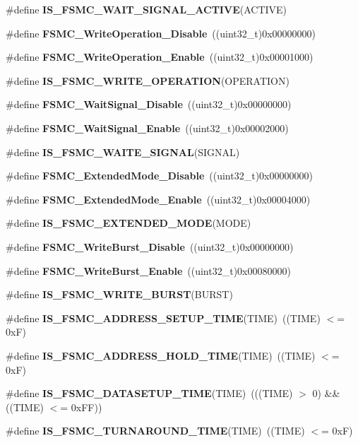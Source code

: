 \begin{DoxyCompactItemize}
\#define \textbf{ I\+S\+\_\+\+F\+S\+M\+C\+\_\+\+W\+A\+I\+T\+\_\+\+S\+I\+G\+N\+A\+L\+\_\+\+A\+C\+T\+I\+VE}(A\+C\+T\+I\+VE)
\item 
\#define \textbf{ F\+S\+M\+C\+\_\+\+Write\+Operation\+\_\+\+Disable}~((uint32\+\_\+t)0x00000000)
\item 
\#define \textbf{ F\+S\+M\+C\+\_\+\+Write\+Operation\+\_\+\+Enable}~((uint32\+\_\+t)0x00001000)
\item 
\#define \textbf{ I\+S\+\_\+\+F\+S\+M\+C\+\_\+\+W\+R\+I\+T\+E\+\_\+\+O\+P\+E\+R\+A\+T\+I\+ON}(O\+P\+E\+R\+A\+T\+I\+ON)
\item 
\#define \textbf{ F\+S\+M\+C\+\_\+\+Wait\+Signal\+\_\+\+Disable}~((uint32\+\_\+t)0x00000000)
\item 
\#define \textbf{ F\+S\+M\+C\+\_\+\+Wait\+Signal\+\_\+\+Enable}~((uint32\+\_\+t)0x00002000)
\item 
\#define \textbf{ I\+S\+\_\+\+F\+S\+M\+C\+\_\+\+W\+A\+I\+T\+E\+\_\+\+S\+I\+G\+N\+AL}(S\+I\+G\+N\+AL)
\item 
\#define \textbf{ F\+S\+M\+C\+\_\+\+Extended\+Mode\+\_\+\+Disable}~((uint32\+\_\+t)0x00000000)
\item 
\#define \textbf{ F\+S\+M\+C\+\_\+\+Extended\+Mode\+\_\+\+Enable}~((uint32\+\_\+t)0x00004000)
\item 
\#define \textbf{ I\+S\+\_\+\+F\+S\+M\+C\+\_\+\+E\+X\+T\+E\+N\+D\+E\+D\+\_\+\+M\+O\+DE}(M\+O\+DE)
\item 
\#define \textbf{ F\+S\+M\+C\+\_\+\+Write\+Burst\+\_\+\+Disable}~((uint32\+\_\+t)0x00000000)
\item 
\#define \textbf{ F\+S\+M\+C\+\_\+\+Write\+Burst\+\_\+\+Enable}~((uint32\+\_\+t)0x00080000)
\item 
\#define \textbf{ I\+S\+\_\+\+F\+S\+M\+C\+\_\+\+W\+R\+I\+T\+E\+\_\+\+B\+U\+R\+ST}(B\+U\+R\+ST)
\item 
\#define \textbf{ I\+S\+\_\+\+F\+S\+M\+C\+\_\+\+A\+D\+D\+R\+E\+S\+S\+\_\+\+S\+E\+T\+U\+P\+\_\+\+T\+I\+ME}(T\+I\+ME)~((T\+I\+ME) $<$= 0x\+F)
\item 
\#define \textbf{ I\+S\+\_\+\+F\+S\+M\+C\+\_\+\+A\+D\+D\+R\+E\+S\+S\+\_\+\+H\+O\+L\+D\+\_\+\+T\+I\+ME}(T\+I\+ME)~((T\+I\+ME) $<$= 0x\+F)
\item 
\#define \textbf{ I\+S\+\_\+\+F\+S\+M\+C\+\_\+\+D\+A\+T\+A\+S\+E\+T\+U\+P\+\_\+\+T\+I\+ME}(T\+I\+ME)~(((T\+I\+ME) $>$ 0) \&\& ((T\+I\+ME) $<$= 0x\+F\+F))
\item 
\#define \textbf{ I\+S\+\_\+\+F\+S\+M\+C\+\_\+\+T\+U\+R\+N\+A\+R\+O\+U\+N\+D\+\_\+\+T\+I\+ME}(T\+I\+ME)~((T\+I\+ME) $<$= 0x\+F)
\item 

\end{DoxyCompactItemize}
